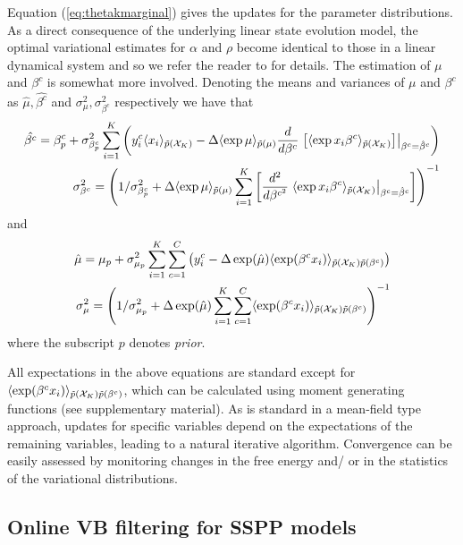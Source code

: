 \documentclass[12pt]{article}
\begin{document}
Equation (\ref{eq:thetakmarginal}) gives the updates for the parameter distributions. As a direct
consequence of the underlying linear state evolution model, the optimal variational estimates for
$\alpha$ and $\rho$ become identical to those in a linear dynamical system and so we refer the reader
to \cite{Beal_2003b} for details. The estimation of $\mu$ and $\beta^c$ is somewhat more involved.
Denoting the means and variances of $\mu$ and $\beta^c$ as $\hat{\mu}, \hat{\beta^c}$ and
$\sigma^2_\mu, \sigma^2_{\beta^c}$ respectively we have that \begin{subequations} \begin{align}
	\hat{\beta^c} = \beta^c_p + \sigma^2_{\beta^c_p}\sum_{i=1}^K \left(y^c_i\langle x_i
	\rangle_{\tilde{p}(\mathcal{X}_K)}- \Delta\langle \exp \mu \rangle_{\tilde{p}(\mu)} \frac{d}{d\beta^c}\left.
	\left[\langle \exp{x_{i}\beta^c}\rangle_{\tilde{p}(\mathcal{X}_K)}\right] \right| _{\beta^c =
	\hat{\beta}^c}  \right) \\ \sigma^2_{\beta^c} = \left(1 / \sigma^2_{\beta^c_p} +
	\Delta\langle \exp \mu \rangle_{\tilde{p}(\mu)} \sum_{i=1}^K  \left[\frac{d^2}{d\beta^{c^2}} \left.
	\langle \exp{x_i\beta^c}\rangle_{\tilde{p}(\mathcal{X}_K)}\right| _{\beta^c =
	\hat{\beta}^c}\right]\right)^{-1} \end{align} \end{subequations} 	\noindent and
	\begin{subequations} \begin{align} \hat{\mu} = \mu_p +
		\sigma^2_{\mu_p}\sum_{i=1}^K\sum_{c=1}^C \left(y^c_i - \Delta\exp(\hat{\mu}) \langle
		\exp(\beta^cx_i)\rangle_{\tilde{p}(\mathcal{X}_K)\tilde{p}(\beta^c)} \right) \\
		\sigma^2_{\mu} = \left(1 / \sigma^2_{\mu_p} + \Delta\exp(\hat{\mu})\sum_{i=1}^K
		\sum_{c=1}^C \langle \exp(\beta^cx_i)\rangle_{\tilde{p}(\mathcal{X}_K)\tilde{p}(\beta^c)} \right)^{-1}
	\end{align} \end{subequations} 	\noindent where the subscript $p$ denotes \emph{prior}.

All expectations in the above equations are standard except for $\langle
\exp(\beta^cx_i)\rangle_{\tilde{p}(\mathcal{X}_K)\tilde{p}(\beta^c)}$, which can be calculated using moment generating
functions (see supplementary material).  As is standard in a mean-field type approach, updates for
specific variables depend on the expectations of the remaining variables, leading to a natural
iterative algorithm. Convergence can be easily assessed by monitoring changes in the free energy
and/ or in the statistics of the variational distributions.  \subsection{Online VB filtering for
SSPP models}\label{sec:OL}
\end{document}
